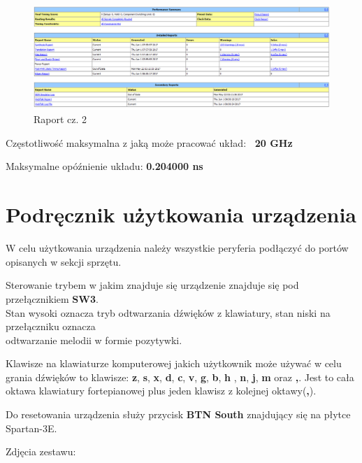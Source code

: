 \documentclass[a4paper]{report}
\begin{document}
	\newpage
	
	\begin{figure}[h!]
				\centering
				\includegraphics[width=1.0\textwidth]{report2.png}
				\caption{Raport cz. 2}
	\end{figure}	
	
	Częstotliwość maksymalna z jaką może pracować układ:
	\textbf{~20 GHz}
	 
	Maksymalne opóźnienie układu:
	\textbf{0.204000 ns}
	
	
		
	\section{Podręcznik użytkowania urządzenia}
	\par W celu użytkowania urządzenia należy wszystkie peryferia podłączyć do portów opisanych w sekcji sprzętu.
	
	\par Sterowanie trybem w jakim znajduje się urządzenie znajduje się pod przełącznikiem \textbf{SW3}. \\Stan wysoki
	oznacza tryb odtwarzania dźwięków z klawiatury, stan niski na przełączniku oznacza \\odtwarzanie melodii w formie
	pozytywki.
	\par Klawisze na klawiaturze komputerowej jakich użytkownik może używać w celu grania dźwięków to klawisze:
	\textbf{z}, \textbf{s}, \textbf{x}, \textbf{d}, \textbf{c}, \textbf{v}, \textbf{g}, \textbf{b}, \textbf{h}
	, \textbf{n}, \textbf{j}, \textbf{m} oraz \textbf{,}. Jest to cała oktawa klawiatury fortepianowej plus jeden
	klawisz z kolejnej oktawy(\textbf{,}).
	
	\par Do resetowania urządzenia służy przycisk \textbf{BTN South} znajdujący się na płytce Spartan-3E.
	
	Zdjęcia zestawu:\\
	
\end{document}
